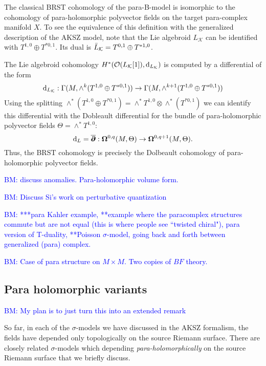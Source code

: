 \documentclass{article}
\newcommand{\KK}{\mathcal{K}}
\newcommand{\cO}{\mathcal{O}}
\newcommand{\p}{\partial}
\newcommand{\pd}{\overline{\p\!\!\!\p}}
\def\d{{\rm d}}
\theoremstyle{definition}
\theoremstyle{remark}
\def\brian{\textcolor{blue}{BM: }\textcolor{blue}}
\begin{document}
The classical BRST cohomology of the para-B-model is isomorphic to the cohomology of para-holomorphic polyvector fields on the target para-complex manifold $X$.
To see the equivalence of this definition with the generalized description of the AKSZ model, note that the Lie algebroid $L_{\KK}$ can be identified with $T^{1,0} \oplus T^{*0,1}$.  
Its dual is $\Bar{L}_{\KK} = T^{0,1} \oplus T^{*1,0}$. 

The Lie algebroid cohomology $H^*(\cO(L_{\KK}[1]), \d_{L_\KK})$ is computed by a differential of the form
\[
\d_{L_\KK} : \Gamma(M , \wedge^k (T^{1,0} \oplus T^{*0,1})) \to \Gamma(M , \wedge^{k+1} (T^{1,0} \oplus T^{*0,1})) 
\]
Using the splitting $\wedge^*(T^{1,0} \oplus T^{*0,1}) = \wedge^* T^{1,0} \otimes \wedge^*(T^{*0,1})$ we can identify this differential with the Dobleault differential for the bundle of para-holomorphic polyvector fields $\Theta = \wedge^* T^{1,0}$:
\[
\d_L = \pd : \mathbf{\Omega}^{0,q} (M , \Theta) \to \mathbf{\Omega}^{0,q+1} (M , \Theta)  .
\]
Thus, the BRST cohomology is precisely the Dolbeault cohomology of para-holomorphic polyvector fields.

\brian{discuss anomalies. Para-holomorphic volume form.}

\brian{Discuss Si's work on perturbative quantization}


\hrulefill

\brian{***para Kahler example, **example where the paracomplex structures commute but are not equal (this is where people see ``twisted chiral"), para version of T-duality, **Poisson $\sigma$-model, going back and forth between generalized (para) complex.
}  

\brian{Case of para structure on $M \times M$. Two copies of $BF$ theory.}

\subsection{Para holomorphic variants}

\brian{My plan is to just turn this into an extended remark}

So far, in each of the $\sigma$-models we have discussed in the AKSZ formalism, the fields have depended only topologically on the source Riemann surface. 
There are closely related $\sigma$-models which depending {\em para-holomorphically} on the source Riemann surface that we briefly discuss. 



\end{document}

